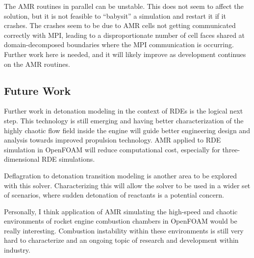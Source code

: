 The AMR routines in parallel can be unstable. This does not seem to affect the solution, but it is not feasible to ``babysit'' a simulation and restart it if it crashes. The crashes seem to be due to AMR cells not getting communicated correctly with MPI, leading to a disproportionate number of cell faces shared at domain-decomposed boundaries where the MPI communication is occurring. Further work here is needed, and it will likely improve as development continues on the AMR routines. 


\subsection{Future Work}
Further work in detonation modeling in the context of RDEs is the logical next step. This technology is still emerging and having better characterization of the highly chaotic flow field inside the engine will guide better engineering design and analysis towards improved propulsion technology. AMR applied to RDE simulation in OpenFOAM will reduce computational cost, especially for three-dimensional RDE simulations. 

Deflagration to detonation transition modeling is another area to be explored with this solver. Characterizing this will allow the solver to be used in a wider set of scenarios, where sudden detonation of reactants is a potential concern. 

Personally, I think application of AMR simulating the high-speed and chaotic environments of rocket engine combustion chambers in OpenFOAM would be really interesting. Combustion instability within these environments is still very hard to characterize and an ongoing topic of research and development within industry. 

